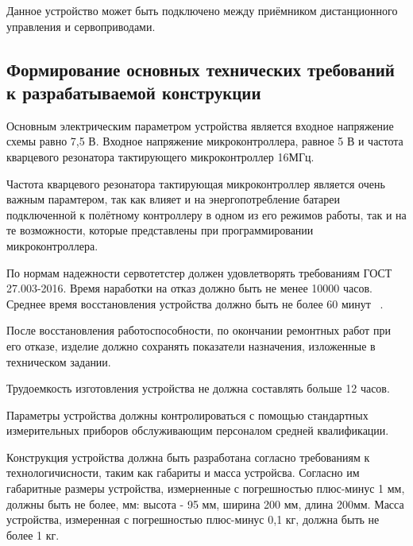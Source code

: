 Данное устройство может быть подключено между приёмником
дистанционного управления и сервоприводами.

\subsection{Формирование основных технических требований \\
  к разрабатываемой конструкции}

Основным электрическим параметром устройства является входное
напряжение схемы равно 7,5 В. Входное напряжение микроконтроллера,
равное 5 В и частота  кварцевого резонатора
тактирующего микроконтроллер 16МГц.

Частота кварцевого резонатора тактирующая микроконтроллер является
очень важным парамтером, так как влияет и на энергопотребление батареи
подключенной к полётному контроллеру в одном из его режимов работы,
так и на те возможности, которые представлены при программировании
микроконтроллера.

По нормам надежности сервотетстер должен удовлетворять требованиям
ГОСТ 27.003-2016. Время наработки на отказ должно быть не менее 10000
часов. Среднее время восстановления устройства должно быть не более 60
минут ~\cite{GOST-27.003-2016}.

После восстановления работоспособности, по окончании ремонтных работ
при его отказе, изделие должно сохранять показатели назначения,
изложенные в техническом задании.

Трудоемкость изготовления устройства не должна
составлять больше 12 часов.

Параметры устройства должны контролироваться с помощью стандартных
измерительных приборов обслуживающим персоналом средней квалификации.

Конструкция устройства должна быть разработана согласно требованиям к
технологичисности, таким как габариты и масса устройсва.  Согласно им
габаритные размеры устройства, измерненные с погрешностью плюс-минус 1
мм, должны быть не более, мм: высота - 95 мм, ширина 200 мм, длина
200мм. Масса устройства, измеренная с погрешностью плюс-минус 0,1 кг,
должна быть не более 1 кг.

\newpage
